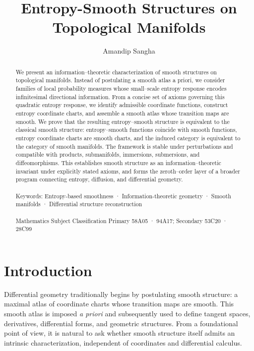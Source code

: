 \documentclass[11pt]{amsart}
\title{Entropy-Smooth Structures on Topological Manifolds}
\author{Amandip Sangha}
\theoremstyle{definition}
\theoremstyle{remark}
\begin{document}
\begin{abstract}
We present an information--theoretic characterization of smooth structures on topological manifolds. 
Instead of postulating a smooth atlas a priori, we consider families of local probability measures whose 
small--scale entropy response encodes infinitesimal directional information. 
From a concise set of axioms governing this quadratic entropy response, we identify admissible coordinate 
functions, construct entropy coordinate charts, and assemble a smooth atlas whose transition maps are smooth. 
We prove that the resulting entropy--smooth structure is equivalent to the classical smooth structure: 
entropy--smooth functions coincide with smooth functions, entropy coordinate charts are smooth charts, 
and the induced category is equivalent to the category of smooth manifolds. 
The framework is stable under perturbations and compatible with products, submanifolds, immersions, 
submersions, and diffeomorphisms. 
This establishes smooth structure as an information--theoretic invariant under explicitly stated axioms, 
and forms the zeroth--order layer of a broader program connecting entropy, diffusion, and differential geometry.
\\ \\
Keywords: Entropy-based smoothness · Information-theoretic geometry · Smooth manifolds ·
Differential structure reconstruction
\\ \\ 
Mathematics Subject Classification Primary 58A05 · 94A17; Secondary 53C20 ·
28C99 
\end{abstract}


\maketitle
\setcounter{tocdepth}{1}
\tableofcontents

\section{Introduction}

Differential geometry traditionally begins by postulating smooth structure: a maximal atlas of coordinate
charts whose transition maps are smooth. This smooth atlas is imposed \emph{a priori} and subsequently used
to define tangent spaces, derivatives, differential forms, and geometric structures. From a foundational
point of view, it is natural to ask whether smooth structure itself admits an intrinsic characterization,
independent of coordinates and differential calculus.
\end{document}

